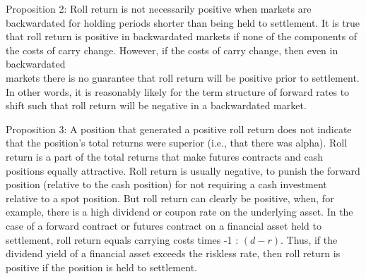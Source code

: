 \documentclass[11pt]{article}
\begin{document}
Proposition 2: Roll return is not necessarily positive when markets are backwardated for holding periods shorter than being held to settlement. It is true that roll return is positive in backwardated markets if none of the components of the costs of carry change. However, if the costs of carry change, then even in backwardated\\
markets there is no guarantee that roll return will be positive prior to settlement. In other words, it is reasonably likely for the term structure of forward rates to shift such that roll return will be negative in a backwardated market.

Proposition 3: A position that generated a positive roll return does not indicate that the position's total returns were superior (i.e., that there was alpha). Roll return is a part of the total returns that make futures contracts and cash positions equally attractive. Roll return is usually negative, to punish the forward position (relative to the cash position) for not requiring a cash investment relative to a spot position. But roll return can clearly be positive, when, for example, there is a high dividend or coupon rate on the underlying asset. In the case of a forward contract or futures contract on a financial asset held to settlement, roll return equals carrying costs times -1 : $(d-r)$. Thus, if the dividend yield of a financial asset exceeds the riskless rate, then roll return is positive if the position is held to settlement.
\end{document}
